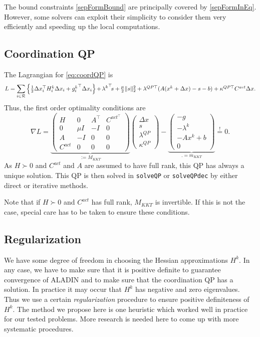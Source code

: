 \documentclass[]{scrartcl}
\begin{document}
The bound constraints  \eqref{sepFormBound} are principally covered by \eqref{sepFormInEq}.
However, some solvers \cite{somePappers} can exploit their simplicity to consider them very efficiently and speeding up the local computations.


\subsection{Coordination QP}

The Lagrangian for \eqref{eq:coordQP} is
\[
L=\sum_{i\in \mathcal{R}}\left\{\textstyle \frac{1}{2}\Delta x_i^\top H^k_i\Delta x_i + {g_i^k}^\top \Delta x_i\right\} \hspace{-0.1em}  + \hspace{-0.1em} {\lambda^k}^\top  \hspace{-0.2em} s + \hspace{-0.1em}  \textstyle \frac{\mu}{2}\|s\|^2_2  + \lambda^{QP\top}(A(x^k+\Delta x)-s-b) + \kappa^{QP\top }C^{act}\Delta x.
\]
Thus, the first order optimality conditions are
\[
\nabla L =
\underbrace{
\begin{pmatrix}
H & 0 & A^\top & C^{act^\top} \\
0 &\mu I & - I & 0 \\
A & -I & 0 & 0 \\
C^{act}  & 0 & 0 & 0
\end{pmatrix}
}_{:=M_{KKT}}
\begin{pmatrix}
\Delta x \\ s \\ \lambda^{QP} \\ \kappa^{QP}
\end{pmatrix}
-
\underbrace{
\begin{pmatrix}
-g \\ - \lambda ^k \\ -Ax^k +b \\ 0
\end{pmatrix}
}_{.=m_{KKT}}
\overset{!}{=}0.
\]
As $H\succ 0$ and $C^{act}$ and $A$ are assumed to have full rank, this QP has always a unique solution.
This QP is then solved in \texttt{solveQP} or \texttt{solveQPdec} by either direct or iterative methods.

Note that if $H\succ 0$ and $C^{act}$ has full rank, $M_{KKT}$ is invertible.
If this is not the case, special care has to be taken to ensure these conditions.


\subsection{Regularization}
We have some degree of freedom in choosing the Hessian approximations $H^k$.
In any case, we have to make sure that it is positive definite to guarantee convergence of ALADIN and to make sure that the coordination QP has a solution.
In practice it may occur that $H^k$ has negative and zero eigenvalues. 
Thus we use a certain \emph{regularization} procedure to ensure positive definiteness of $H^k$.
The method we propose here is one heuristic which worked well in practice for our tested problems.
More research is needed here to come up with more systematic procedures.
\end{document}
